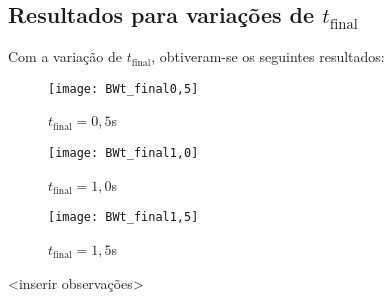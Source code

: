 \subsection{Resultados para variações de $t_{\text{final}}$}
Com a variação de $t_{\text{final}}$, obtiveram-se os seguintes resultados:
\begin{figure}[H]
    \centering
    \texttt{[image: BWt\_final0,5]}
    \caption{$t_{\text{final}} = 0,5$s}
\end{figure}
\begin{figure}[H]
    \centering
    \texttt{[image: BWt\_final1,0]}
    \caption{$t_{\text{final}} = 1,0$s}
\end{figure}
\begin{figure}[H]
    \centering
    \texttt{[image: BWt\_final1,5]}
    \caption{$t_{\text{final}} = 1,5$s}
\end{figure}
<inserir observações>